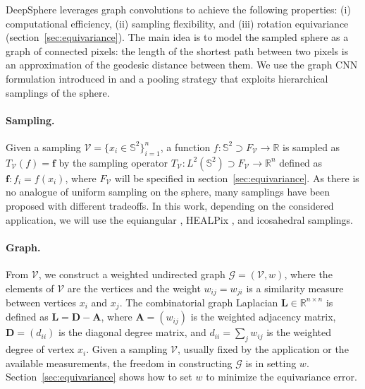 \documentclass{article} %
\renewcommand{\b}[1]{{\bm{#1}}}  %
\newcommand{\R}{\mathbb{R}}
\renewcommand{\S}{\mathbb{S}}
\newcommand{\G}{\mathcal{G}}  %
\newcommand{\V}{\mathcal{V}}  %
\DeclareMathOperator*{\diag}{diag}
\newcommand{\figref}[1]{figure~\ref{fig:#1}}
\newcommand{\secref}[1]{section~\ref{sec:#1}}
\newcommand{\Secref}[1]{Section~\ref{sec:#1}}
\begin{document}
DeepSphere leverages graph convolutions to achieve the following properties: (i) computational efficiency, (ii) sampling flexibility, and (iii) rotation equivariance (\secref{equivariance}).
The main idea is to model the sampled sphere as a graph of connected pixels: the length of the shortest path between two pixels is an approximation of the geodesic distance between them.
We use the graph CNN formulation introduced in \citep{defferrard2016graphnn} and a pooling strategy that exploits hierarchical samplings of the sphere.

\paragraph{Sampling.}
Given a sampling $\V = \{x_i \in \S^2\}_{i=1}^n$, a function $f : \S^2 \supset F_\V \to \R$ is sampled as $T_\V(f) = \b{f}$ by the sampling operator $T_\V: L^2(\S^2) \supset F_\V \to \R^n$ defined as $\b{f}: f_i=f(x_i)$, where $F_\V$ will be specified in \secref{equivariance}.
As there is no analogue of uniform sampling on the sphere, many samplings have been proposed with different tradeoffs.
In this work, depending on the considered application, we will use the equiangular \citep{driscoll1994Fouriersphere}, HEALPix \citep{gorski2005healpix}, and icosahedral \citep{baumgardner1985icosahedral} samplings.

\paragraph{Graph.}
From $\V$, we construct a weighted undirected graph $\G = (\V, w)$, where the elements of $\V$ are the vertices and the weight $w_{ij} = w_{ji}$ is a similarity measure between vertices $x_i$ and $x_j$.
The combinatorial graph Laplacian $\b{L} \in \R^{n \times n}$ is defined as $\b{L} = \b{D} - \b{A}$, where $\b{A} = (w_{ij})$ is the weighted adjacency matrix, $\b{D} = (d_{ii})$ is the diagonal degree matrix, and $d_{ii} = \sum_j w_{ij}$ is the weighted degree of vertex $x_i$.
Given a sampling $\V$, usually fixed by the application or the available measurements, the freedom in constructing $\G$ is in setting $w$.
\Secref{equivariance} shows how to set $w$ to minimize the equivariance error.
\end{document}
